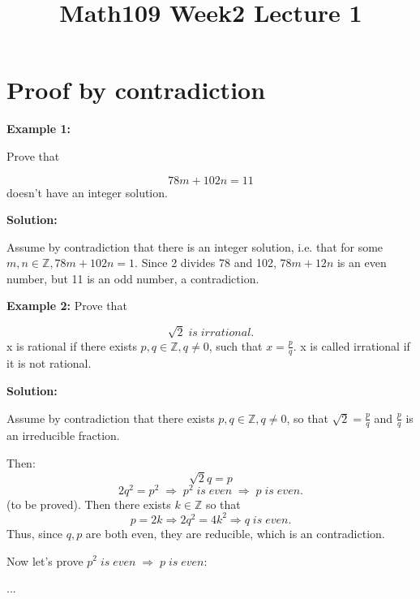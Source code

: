 \documentclass[14pt]{extarticle}
\title{Math109 Week2 Lecture 1}
\begin{document}
\maketitle{}
\section{Proof by contradiction}
{\bfseries Example 1:}
\begin{flushleft}
\vspace{0.3cm}Prove that
\end{flushleft}

\vspace{0.3cm}\begin{equation}
78m+102n=11
\end{equation}
doesn't have an integer solution.
\begin{flushleft}
{\bfseries Solution:}
\end{flushleft}
\vspace{0.3cm}Assume by contradiction that there is an integer solution, i.e. that for some $m,n \in \mathbb{Z}, 78m+102n=1$. Since 2 divides 78 and 102, $78m+12n$ is an even number, but 11 is an odd number, a contradiction.
\begin{flushleft}
{\bfseries Example 2:}
\vspace{0.3cm}Prove that
\end{flushleft}
\vspace{0.3cm}\begin{equation}
\sqrt{2}\; is \; irrational.
\end{equation}
\vspace{0.3cm}x is rational if there exists $p,q \in  \mathbb{Z}, q \neq 0$, such that $x = \frac{p}{q}$. x is called irrational if it is not rational.
\begin{flushleft}
{\bfseries Solution:} 
\end{flushleft}
\vspace{0.3cm}Assume by contradiction that there exists $p,q \in \mathbb{Z}, q \neq0$, so that $\sqrt{2} = \frac{p}{q}$  and $\frac{p}{q}$ is an irreducible fraction. 

\vspace{0.3cm}Then:
\begin{equation}
\sqrt{2}q=p
\end{equation}
\vspace{0.3cm}\begin{equation}
2q^{2}=p^{2} \; \Rightarrow \;p^{2} \;is\; even\; \Rightarrow\; p \;is\;even.
\end{equation}
\vspace{0.3cm}(to be proved). Then there exists $k \in \mathbb{Z}$ so that 
\begin{equation}
p=2k \Rightarrow 2q^{2} = 4k^{2} \Rightarrow q\;is\;even.
\end{equation}
Thus, since $q,p$ are both even, they are reducible, which is an contradiction.
\begin{flushleft}
\vspace{0.3cm}Now let's prove $p^{2} \;is\; even\; \Rightarrow\; p \;is\;even$:

\vspace{0.3cm}...
\end{flushleft}
\end{document}
